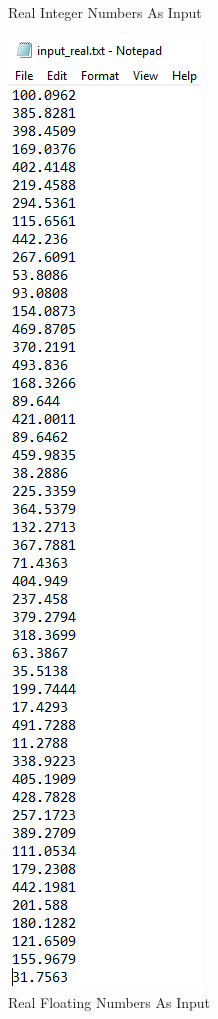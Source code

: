 \documentclass[12pt, titlepage]{article}
\begin{document}
\begin{figure}[h!]
\begin{minipage}[b]{0.32\textwidth}
\caption{Real Integer Numbers As Input}
\label{Fig_Inputreal} 
\end{minipage}
\hfill
\begin{minipage}[b]{0.31\textwidth}
 \includegraphics[width=\textwidth]{Input_floatingReal}
\caption{Real Floating Numbers As Input}
\label{Fig_InputfloatingReal} 
\end{minipage}
\end{figure}
\end{document}
